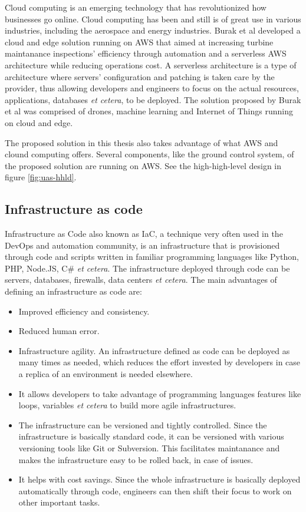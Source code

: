 Cloud computing is an emerging technology that has revolutionized how businesses go online. Cloud computing has been and still is of great use in various industries, including the aerospace and energy industries. Burak et al developed a cloud and edge solution running on AWS that aimed at increasing turbine maintanance inspections' efficiency through automation and a serverless AWS architecture while reducing operations cost\cite{burakawswindfarm2021}. A serverless architecture is a type of architecture where servers' configuration and patching is taken care by the provider, thus allowing developers and engineers to focus on the actual resources, applications, databases \textit{et cetera}, to be deployed. The solution proposed by Burak et al was comprised of drones, machine learning and Internet of Things running on cloud and edge.

The proposed solution in this thesis also takes advantage of what AWS and clound computing offers. Several components, like the ground control system, of the proposed solution are running on AWS. See the high-high-level design in figure \ref{fig:uas-hhld}.

\subsection{Infrastructure as code}
Infrastructure as Code also known as IaC, a technique very often used in the DevOps and automation community, is an infrastructure that is provisioned through code and scripts written in familiar programming languages like Python, PHP, Node.JS, C\# \textit{et cetera}. The infrastructure deployed through code can be servers, databases, firewalls, data centers \textit{et cetera}. The main advantages of defining an infrastructure as code are:

\begin{itemize}
    \item Improved efficiency and consistency.
    \item Reduced human error.
    \item Infrastructure agility. An infrastructure defined as code can be deployed as many times as needed, which reduces the effort invested by developers in case a replica of an environment is needed elsewhere.
    \item It allows developers to take advantage of programming languages features like loops, variables \textit{et cetera} to build more agile infrastructures.
    \item The infrastructure can be versioned and tightly controlled. Since the infrastructure is basically standard code, it can be versioned with various versioning tools like Git or Subversion. This facilitates maintanance and makes the infrastructure easy to be rolled back, in case of issues.
    \item It helps with cost savings. Since the whole infrastructure is basically deployed automatically through code, engineers can then shift their focus to work on other important tasks.
\end{itemize}

